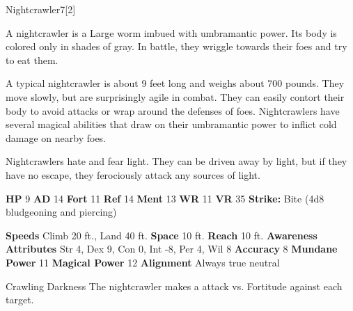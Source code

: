   \begin{monsection}{Nightcrawler}{7}[2]
    \vspace{-1em}\vspace{-1em}
    \vspace{0em}

    
        A nightcrawler is a Large worm imbued with umbramantic power.
        Its body is colored only in shades of gray.
        In battle, they wriggle towards their foes and try to eat them.
      
        A typical nightcrawler is about 9 feet long and weighs about 700 pounds.
        They move slowly, but are surprisingly agile in combat.
        They can easily contort their body to avoid attacks or wrap around the defenses of foes.
        Nightcrawlers have several magical abilities that draw on their umbramantic power to inflict cold damage on nearby foes.
      
        Nightcrawlers hate and fear light.
        They can be driven away by light, but if they have no escape, they ferociously attack any sources of light.
      

    \begin{spellcontent}
      \begin{spelltargetinginfo}
        \pari \textbf{HP} 9 \monsep
          \textbf{AD} 14 \monsep
          \textbf{Fort} 11 \monsep
          \textbf{Ref} 14 \monsep
          \textbf{Ment} 13
        \pari \textbf{WR} 11 \monsep
        \textbf{VR} 35
        \pari \textbf{Strike:}
            Bite  (4d8 bludgeoning and piercing)
      \end{spelltargetinginfo}
    \end{spellcontent}
    \begin{monsterfooter}
      \pari \textbf{Speeds} Climb 20 ft., Land 40 ft. \monsep
        \textbf{Space} 10 ft. \monsep
        \textbf{Reach} 10 ft.
      \pari \textbf{Awareness} 
      \pari \textbf{Attributes}
        Str 4, Dex 9,
        Con 0, Int -8,
        Per 4, Wil 8
      \pari \textbf{Accuracy} 8 \monsep
        \textbf{Mundane Power} 11 \monsep
      \textbf{Magical Power} 12
      \pari \textbf{Alignment} Always true neutral
    \end{monsterfooter}
  \end{monsection}
  \begin{freeability}{Crawling Darkness}
       The nightcrawler makes a  attack
        vs. Fortitude against each target.
    \end{freeability}
  

